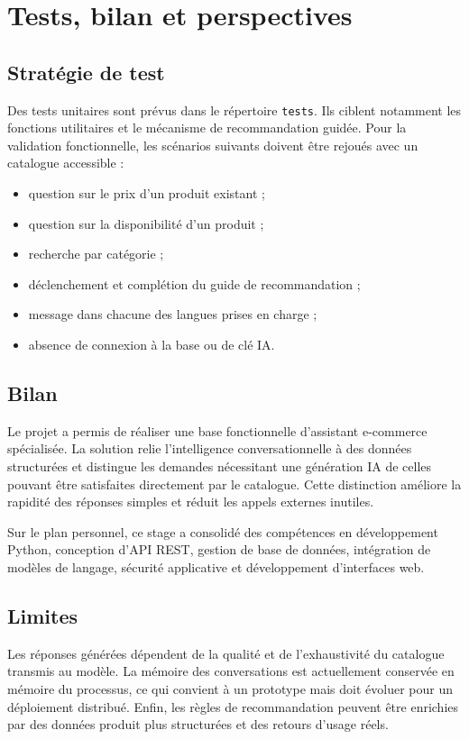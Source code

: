\documentclass[12pt,a4paper,oneside]{report}
\begin{document}
\chapter{Tests, bilan et perspectives}
\section{Stratégie de test}
Des tests unitaires sont prévus dans le répertoire \texttt{tests}. Ils ciblent notamment les fonctions utilitaires et le mécanisme de recommandation guidée. Pour la validation fonctionnelle, les scénarios suivants doivent être rejoués avec un catalogue accessible :
\begin{itemize}
  \item question sur le prix d'un produit existant ;
  \item question sur la disponibilité d'un produit ;
  \item recherche par catégorie ;
  \item déclenchement et complétion du guide de recommandation ;
  \item message dans chacune des langues prises en charge ;
  \item absence de connexion à la base ou de clé IA.
\end{itemize}

\section{Bilan}
Le projet a permis de réaliser une base fonctionnelle d'assistant e-commerce spécialisée. La solution relie l'intelligence conversationnelle à des données structurées et distingue les demandes nécessitant une génération IA de celles pouvant être satisfaites directement par le catalogue. Cette distinction améliore la rapidité des réponses simples et réduit les appels externes inutiles.

Sur le plan personnel, ce stage a consolidé des compétences en développement Python, conception d'API REST, gestion de base de données, intégration de modèles de langage, sécurité applicative et développement d'interfaces web.

\section{Limites}
Les réponses générées dépendent de la qualité et de l'exhaustivité du catalogue transmis au modèle. La mémoire des conversations est actuellement conservée en mémoire du processus, ce qui convient à un prototype mais doit évoluer pour un déploiement distribué. Enfin, les règles de recommandation peuvent être enrichies par des données produit plus structurées et des retours d'usage réels.
\end{document}
